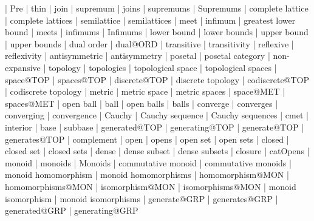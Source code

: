     |   Pre
    |   thin
    |   join
    |   supremum
    |   joins
    |   supremums
    |   Supremums
    |   complete lattice
    |   complete lattices
    |   semilattice
    |   semilattices
    |   meet
    |   infimum
    |   greatest lower bound
    |   meets
    |   infimums
    |   Infimums
    |   lower bound
    |   lower bounds
    |   upper bound
    |   upper bounds
    |   dual order
    |   dual@ORD
    |   transitive
    |   transitivity
    |   reflexive
    |   reflexivity
    |   antisymmetric
    |   antisymmetry
    |   posetal
    |   posetal category
    |   non-expansive
    |   topology
    |   topologies
    |   topological space
    |   topological spaces
    |   space@TOP
    |   spaces@TOP
    |   discrete@TOP
    |   discrete topology
    |   codiscrete@TOP
    |   codiscrete topology
    |   metric
    |   metric space
    |   metric spaces
    |   space@MET
    |   spaces@MET
    |   open ball
    |   ball
    |   open balls
    |   balls
    |   converge
    |   converges
    |   converging
    |   convergence
    |   Cauchy
    |   Cauchy sequence
    |   Cauchy sequences
    |   cmet
    |   interior
    |   base
    |   subbase
    |   generated@TOP
    |   generating@TOP
    |   generate@TOP
    |   generates@TOP
    |   complement
    |   open
    |   opens
    |   open set
    |   open sets
    |   closed
    |   closed set
    |   closed sets
    |   dense
    |   dense subset
    |   dense subsets
    |   closure
    |   catOpens
    |   monoid
    |   monoids
    |   Monoids
    |   commutative monoid
    |   commutative monoids
    |   monoid homomorphism
    |   monoid homomorphisms
    |   homomorphism@MON
    |   homomorphisms@MON
    |   isomorphism@MON
    |   isomorphisms@MON
    |   monoid isomorphism
    |   monoid isomorphisms
    |   generate@GRP
    |   generates@GRP
    |   generated@GRP
    |   generating@GRP
